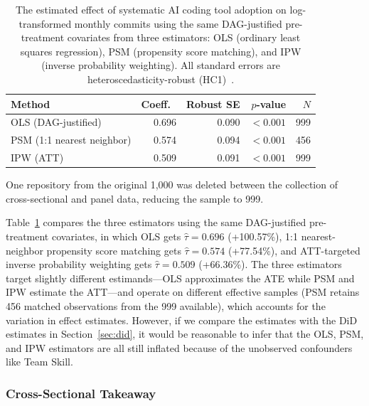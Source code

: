 \begin{table}[t]
  \centering
  \caption{The estimated effect of systematic AI coding tool adoption on log-transformed monthly commits using the same DAG-justified pre-treatment covariates from three estimators: OLS (ordinary least squares regression), PSM (propensity score matching), and IPW (inverse probability weighting).
  \label{tab:three-estimators}
  All standard errors are heteroscedasticity-robust (HC1)~\cite{mackinnon1985heteroskedasticity}.}
  \begin{threeparttable}
  \small
  \begin{tabular}{lrrrr}
  \toprule
  Method & Coeff.\ & Robust SE & $p$-value & $N$ \\
  \midrule
  OLS (DAG-justified) & 0.696 & 0.090 & ${<}0.001$ & 999\tnote{a} \\
  PSM (1:1 nearest neighbor) & 0.574 & 0.094 & ${<}0.001$ & 456 \\
  IPW (ATT) & 0.509 & 0.091 & ${<}0.001$ & 999\tnote{a} \\
  \bottomrule
  \end{tabular}
  \begin{tablenotes}
  \footnotesize
  \item[a] One repository from the original 1,000 was deleted between the collection of cross-sectional and panel data, reducing the sample to 999.
  \end{tablenotes}
  \end{threeparttable}
  \end{table}

Table~\ref{tab:three-estimators} compares the three estimators using the same DAG-justified pre-treatment covariates, in which OLS gets $\hat{\tau} = 0.696$ (+100.57\%), 1:1 nearest-neighbor propensity score matching gets $\hat{\tau} = 0.574$ (+77.54\%), and ATT-targeted inverse probability weighting gets $\hat{\tau} = 0.509$ (+66.36\%).
The three estimators target slightly different estimands---OLS approximates the ATE while PSM and IPW estimate the ATT---and operate on different effective samples (PSM retains 456 matched observations from the 999 available), which accounts for the variation in effect estimates.
However, if we compare the estimates with the DiD estimates in Section~\ref{sec:did}, it would be reasonable to infer that the OLS, PSM, and IPW estimators are all still inflated because of the unobserved confounders like Team Skill.

\subsubsection{Cross-Sectional Takeaway}
\label{sec:cross-sectional-takeaway}


